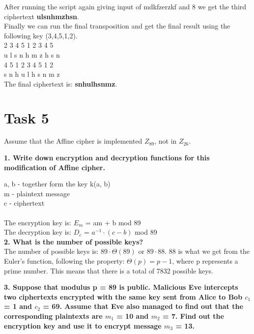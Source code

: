 \documentclass[12pt]{article}
\begin{document}
\noindent After running the script again giving input of mdkfzerzkf and 8 we get the
third ciphertext \textbf{ulsnhmzhsn}. \\

\noindent Finally we can run the final transposition and get the final result using
the following key (3,4,5,1,2). \\

  2  3  4  5  1  2  3  4  5 \\
u  l  s  n  h  m  z  h  s  n \\ 

  4  5  1  2  3  4  5  1  2 \\
s  n  h  u  l  h  s  n  m  z \\

\noindent The final ciphertext is: \textbf{snhulhsnmz}.


\section*{Task 5}

Assume that the Affine cipher is implemented $Z_{89}$, not in $Z_{26}$.
\newline

\noindent
\textbf{1. Write down encryption and decryption functions for this modification of Affine cipher.}\newline

\noindent a, b - together form the key k(a, b) \\
m - plaintext message \\
c - ciphertext \\\\
\noindent The encryption key is: $E_m$ = am + b mod 89 \\
The decryption key is: $D_c$ = $a^{-1} \cdot (c - b)$ mod 89 \\

\noindent \textbf{2. What is the number of possible keys?}
\newline
\noindent
\\The number of possible keys is: $89 \cdot \Theta(89)$ or $89 \cdot 88$. 88 is 
what we get from the Euler's function, following the property: $\Theta(p) = p - 1$, 
where p represents a prime number. This means that there is a total of 7832 possible
keys.
\newline

\noindent \textbf{3. Suppose that modulus p = 89 is public. Malicious Eve intercepts 
two ciphertexts encrypted with the same key sent from Alice to Bob $c_1$ = 1 and
$c_2$ = 69. Assume that Eve also managed to find out that the corresponding 
plaintexts are $m_1$ = 10 and $m_2$ = 7. Find out the encryption key and use it 
to encrypt message $m_3$ = 13.}
\newline
\end{document}
